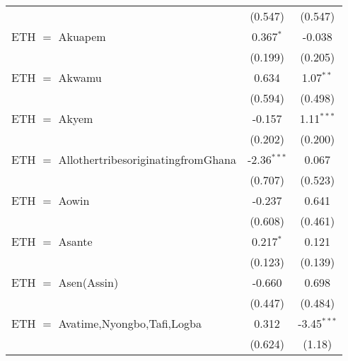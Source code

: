 \begin{table}[htbp!]
\begin{adjustbox}{width = 1\textwidth, max height = 0.95\textheight, center}
\begin{threeparttable}[b]
\begin{tabular}{lcc}
                                                                                      & (0.547)       & (0.547)\\   
            ETH $=$ Akuapem                                                           & 0.367$^{*}$   & -0.038\\   
                                                                                      & (0.199)       & (0.205)\\   
            ETH $=$ Akwamu                                                            & 0.634         & 1.07$^{**}$\\   
                                                                                      & (0.594)       & (0.498)\\   
            ETH $=$ Akyem                                                             & -0.157        & 1.11$^{***}$\\   
                                                                                      & (0.202)       & (0.200)\\   
            ETH $=$ AllothertribesoriginatingfromGhana                                & -2.36$^{***}$ & 0.067\\   
                                                                                      & (0.707)       & (0.523)\\   
            ETH $=$ Aowin                                                             & -0.237        & 0.641\\   
                                                                                      & (0.608)       & (0.461)\\   
            ETH $=$ Asante                                                            & 0.217$^{*}$   & 0.121\\   
                                                                                      & (0.123)       & (0.139)\\   
            ETH $=$ Asen(Assin)                                                       & -0.660        & 0.698\\   
                                                                                      & (0.447)       & (0.484)\\   
            ETH $=$ Avatime,Nyongbo,Tafi,Logba                                        & 0.312         & -3.45$^{***}$\\   
                                                                                      & (0.624)       & (1.18)\\   

\end{tabular}
\end{threeparttable}
\end{adjustbox}
\end{table}
